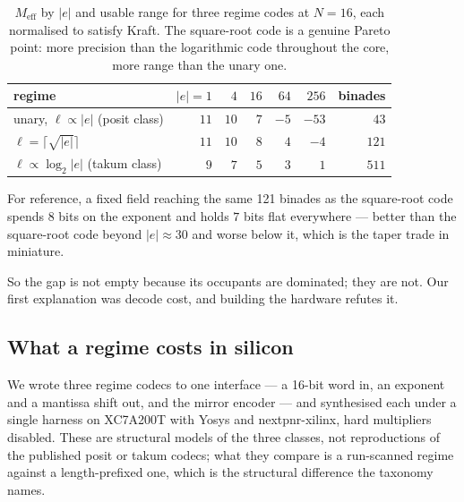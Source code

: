 \documentclass[11pt]{article}
\theoremstyle{definition}
\begin{document}
\begin{table}[t]\centering
\caption{$M_{\mathrm{eff}}$ by $|e|$ and usable range for three regime codes at
$N = 16$, each normalised to satisfy Kraft. The square-root code is a genuine
Pareto point: more precision than the logarithmic code throughout the core, more
range than the unary one.}
\label{tab:codes}
\begin{tabular}{lrrrrrr}
\toprule
regime & $|e|{=}1$ & $4$ & $16$ & $64$ & $256$ & binades \\
\midrule
unary, $\ell \propto |e|$ (posit class)      & $11$ & $10$ & $7$ & $-5$ & $-53$ & $43$ \\
$\ell = \lceil\sqrt{|e|}\rceil$              & $11$ & $10$ & $8$ & $4$  & $-4$  & $121$ \\
$\ell \propto \log_2|e|$ (takum class)       & $9$  & $7$  & $5$ & $3$  & $1$   & $511$ \\
\bottomrule
\end{tabular}
\end{table}

For reference, a fixed field reaching the same 121 binades as the square-root code
spends 8 bits on the exponent and holds $7$ bits flat everywhere --- better than
the square-root code beyond $|e| \approx 30$ and worse below it, which is the
taper trade in miniature.

So the gap is not empty because its occupants are dominated; they are not. Our
first explanation was decode cost, and building the hardware refutes it.

\subsection{What a regime costs in silicon}\label{sec:regimecost}

We wrote three regime codecs to one interface --- a 16-bit word in, an exponent
and a mantissa shift out, and the mirror encoder --- and synthesised each under a
single harness on XC7A200T with Yosys and nextpnr-xilinx, hard multipliers
disabled. These are structural models of the three classes, not reproductions of
the published posit or takum codecs; what they compare is a run-scanned regime
against a length-prefixed one, which is the structural difference the taxonomy
names.
\end{document}
